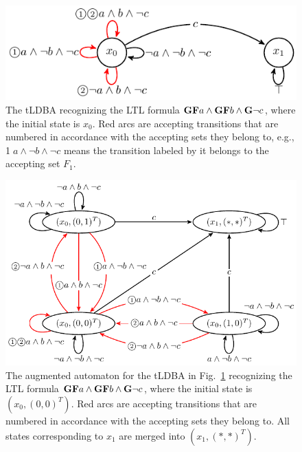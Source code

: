 \documentclass[a4j,12pt,oneside,openany,english]{jsbook}
\begin{document}
\begin{figure}[htbp]
   \centering
   \vspace{2mm}
   \includegraphics[bb=0 0 247 80,scale=0.85]{ldgba_original.pdf}
   \caption{The tLDBA recognizing the LTL formula $\text{{\bf GF}}a \wedge \text{{\bf GF}}b \wedge \text{{\bf G}}\neg c$, where the initial state is $x_0$. Red arcs are accepting transitions that are numbered in accordance with the accepting sets they belong to, e.g., \textcircled{\scriptsize 1}$a \land \neg b \land \neg c$ means the transition labeled by it belongs to the accepting set $F_1$.}
   \label{automaton}
\end{figure}

\begin{figure}[htbp]
   \centering
   \includegraphics[bb=0 0 374 207,scale=0.75]{ldgba.pdf}
   \caption{The augmented automaton for the tLDBA in Fig.~\ref{automaton} recognizing the LTL formula $\text{{\bf GF}}a \wedge \text{{\bf GF}}b \wedge \text{{\bf G}}\neg c$, where the initial state is $(x_0, (0,0)^T )$. Red arcs are accepting transitions that are numbered in accordance with the accepting sets they belong to. All states corresponding to $x_1$ are merged into $(x_1, (*,*)^T )$.}
   \label{automaton_aug}
\end{figure}
\end{document}

